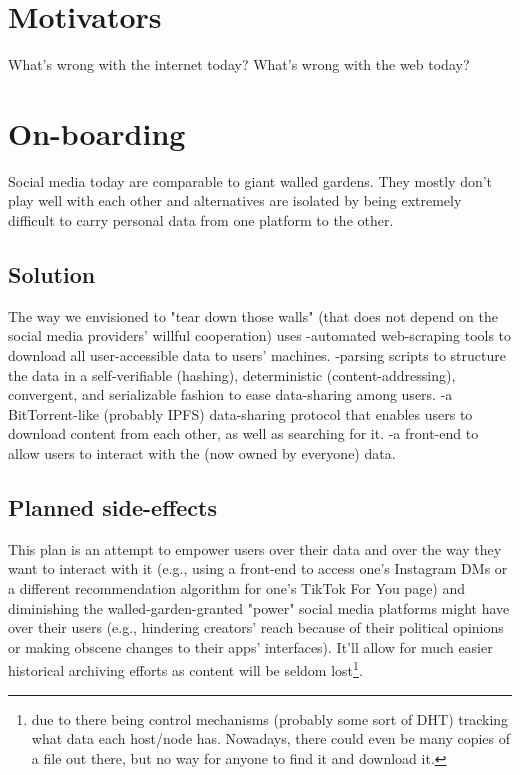 \section{Motivators}

What's wrong with the internet today? What's wrong with the web today?

\section{On-boarding}

Social media today are comparable to giant walled gardens. They mostly don't play well with each other and alternatives are isolated by being extremely difficult to carry personal data from one platform to the other.

\subsection{Solution} The way we envisioned to "tear down those walls" (that does not depend on the social media providers' willful cooperation) uses -automated web-scraping tools to download all user-accessible data to users' machines. -parsing scripts to structure the data in a self-verifiable (hashing), deterministic (content-addressing), convergent, and serializable fashion to ease data-sharing among users. -a BitTorrent-like (probably IPFS) data-sharing protocol that enables users to download content from each other, as well as searching for it. -a front-end to allow users to interact with the (now owned by everyone) data.

\subsection{Planned side-effects} This plan is an attempt to empower users over their data and over the way they want to interact with it (e.g., using a front-end to access one's Instagram DMs or a different recommendation algorithm for one's TikTok For You page) and diminishing the walled-garden-granted "power" social media platforms might have over their users (e.g., hindering creators' reach because of their political opinions or making obscene changes to their apps' interfaces). It'll allow for much easier historical archiving efforts as content will be seldom lost\footnote{due to there being control mechanisms (probably some sort of DHT) tracking what data each host/node has. Nowadays, there could even be many copies of a file out there, but no way for anyone to find it and download it.}.
